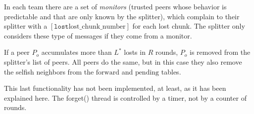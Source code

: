 
\label{sec:free_riding_control}

In each team there are a set of \emph{monitors} (trusted peers whose
behavior is predictable and that are only known by the splitter),
which complain to their splitter with a $[\mathtt{lost}
  \text{lost\_chunk\_number}]$ for each lost chunk. The splitter only
considers these type of messages if they come from a monitor.

If a peer $P_o$ accumulates more than $L^*$ losts in $R$ rounds, $P_o$
is removed from the splitter's list of peers. All peers do the same, but
in this case they also remove the selfish neighbors from the
$\text{forward}$ and $\text{pending}$ tables.


\begin{notex}
This last functionality has not been implemented, at least, as it has
been explained here. The forget() thread is controlled by a timer, not
by a counter of rounds.
\end{notex}

